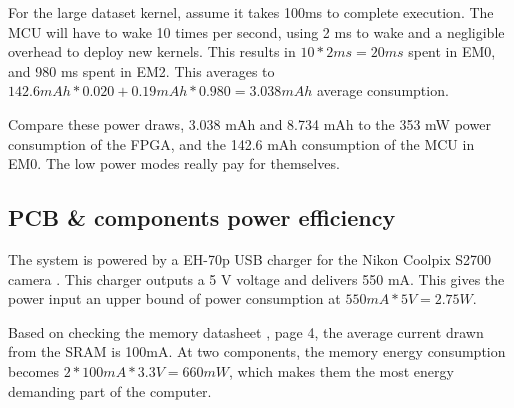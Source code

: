 \documentclass[../main/report.tex]{subfiles}
\begin{document}
For the large dataset kernel, assume it takes 100ms to complete execution.
The MCU will have to wake 10 times per second, using 2 ms to wake and a negligible overhead to deploy new kernels.
This results in $ 10 * 2 ms = 20 ms $ spent in EM0, and 980 ms spent in EM2.
This averages to $ 142.6 mAh * 0.020 + 0.19 mAh * 0.980 = 3.038 mAh $ average consumption.

Compare these power draws, 3.038 mAh and 8.734 mAh to the 353 mW power consumption of the FPGA, and the 142.6 mAh consumption of the MCU in EM0.
The low power modes really pay for themselves.

\subsection{PCB \& components power efficiency}

The system is powered by a EH-70p USB charger for the Nikon Coolpix S2700 camera \cite[p. 196]{usb-charger}.
This charger outputs a 5 V voltage and delivers 550 mA.
This gives the power input an upper bound of power consumption at $550mA * 5V = 2.75W$.

Based on checking the memory datasheet \cite{SRAM-datasheet}, page 4, the average current drawn from the SRAM is 100mA.
At two components, the memory energy consumption becomes $2 * 100mA * 3.3V = 660mW$, which makes them the most energy demanding part of the computer. 
\end{document}
